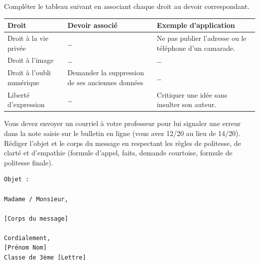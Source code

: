 \documentclass[11pt]{article}
\begin{document}
\begin{exercice}
Compléter le tableau suivant en associant chaque droit au devoir correspondant.
\begin{center}
\begin{tabularx}{\linewidth}{|X|X|X|}
\hline
\textbf{Droit} & \textbf{Devoir associé} & \textbf{Exemple d'application} \\
\hline
Droit à la vie privée & \ldots & Ne pas publier l'adresse ou le téléphone d'un camarade. \\
\hline
Droit à l'image & \ldots & \ldots \\
\hline
Droit à l'oubli numérique & Demander la suppression de ses anciennes données & \ldots \\
\hline
Liberté d'expression & \ldots & Critiquer une idée sans insulter son auteur. \\
\hline
\end{tabularx}
\end{center}
\end{exercice}

\begin{exercice}
Vous devez envoyer un courriel à votre professeur pour lui signaler une erreur dans la note saisie sur le bulletin en ligne (vous avez 12/20 au lieu de 14/20). Rédiger l'objet et le corps du message en respectant les règles de politesse, de clarté et d'empathie (formule d'appel, faits, demande courtoise, formule de politesse finale).
\begin{verbatim}
Objet : 

Madame / Monsieur,

[Corps du message]

Cordialement,
[Prénom Nom]
Classe de 3ème [Lettre]
\end{verbatim}
\end{exercice}
\end{document}
